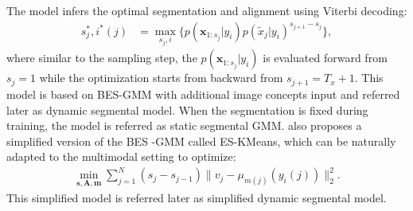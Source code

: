 \documentclass[journal]{IEEEtran}
\begin{document}
 The model infers the optimal segmentation and alignment using Viterbi decoding:
\begin{align}\label{eq:decode_besgmm}
    s_j^*, i^*(j) &= \max_{s_j, i}\{p(\mathbf x_{1:s_j}|y_{i})p(\tilde{x}_j|y_{i})^{s_{j+1}-s_j}\},
\end{align}
where similar to the sampling step, the $p(\mathbf x_{1:s_j}|y_{i})$ is evaluated forward from $s_j=1$ while the optimization starts from backward from $s_{j+1}=T_x+1$. This model is based on BES-GMM \cite{Kamper2017} with additional image concepts input and referred later as dynamic segmental model. When the segmentation is fixed during training, the model is referred as static segmental GMM. \cite{Kamper2017} also proposes a simplified version of the BES -GMM called ES-KMeans, which can be naturally adapted to the multimodal setting to optimize:
\begin{align}\label{eq:objective_multimodal_eskmeans}
    \min_{\mathbf s, \mathbf A, \mathbf m}\sum_{j=1}^{N}(s_j-s_{j-1})\|v_j - \mu_{m(j)}(y_i(j))\|_2^2.
\end{align}
This simplified model is referred later as simplified dynamic segmental model.

\end{document}

